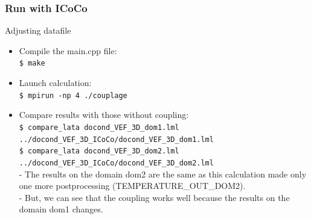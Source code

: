 \documentclass[10pt, hyperref={unicode=true,pdfusetitle, bookmarks=true,bookmarksnumbered=false,bookmarksopen=false, breaklinks=false,pdfborder={0 0 1},backref=true,colorlinks=true,linkcolor=darkblue,pageanchor, urlcolor=darkblue}]{beamer}
\begin{document}
\begin{frame}
\frametitle{Run with ICoCo}

\begin{block}{Adjusting datafile}
\begin{itemize}
\item Compile the main.cpp file:\\
\texttt{\$ make}
\item Launch calculation:\\
\texttt{\$ mpirun -np 4 ./couplage}
\item Compare results with those without coupling:\\
\texttt{\$ compare\_lata docond\_VEF\_3D\_dom1.lml ../docond\_VEF\_3D\_ICoCo/docond\_VEF\_3D\_dom1.lml }\\
\texttt{\$ compare\_lata docond\_VEF\_3D\_dom2.lml ../docond\_VEF\_3D\_ICoCo/docond\_VEF\_3D\_dom2.lml }\\
- The results on the domain dom2 are the same as this calculation made only one more postprocessing (TEMPERATURE\_OUT\_DOM2). \\
- But, we can see that the coupling works well because the results on the domain dom1 changes.
\end{itemize}
\end{block}

\end{frame}
\end{document}

